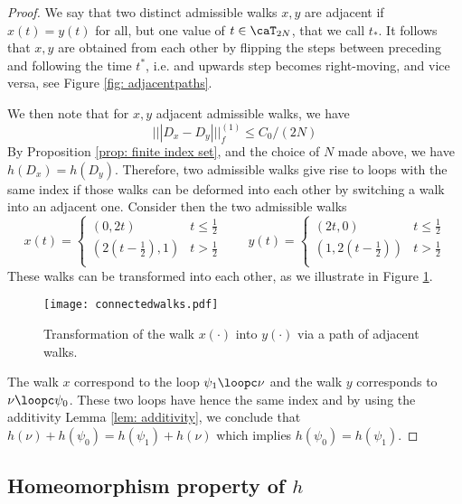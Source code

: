 \begin{proof}
	We say that two distinct admissible walks $x,y$ are adjacent if $x(t)=y(t)$ for all, but one value of $t\in\caT_{2N}$, that we call $t_*$.  It follows that $x,y$ are obtained from each other by flipping the steps between preceding and following the time $t^*$, i.e. and upwards step becomes right-moving, and vice versa, see Figure \ref{fig: adjacentpaths}.  
	
	We then note that for $x,y$ adjacent admissible walks, we have
	$$
	||| D_x-D_y |||^{(1)}_f \leq C_0/(2N)
	$$
	By Proposition \ref{prop: finite index set}, and the choice of $N$ made above, we have $h(D_x)=h(D_y)$.  Therefore, two admissible walks give rise to loops with the same index if those walks can be deformed into each other by switching a walk into an adjacent one. 
	Consider then the two admissible walks
	$$
	x(t)=\begin{cases} (0,2t) &  t \leq \tfrac{1}{2} \\
	(2(t- \tfrac{1}{2}),1) &  t  > \tfrac{1}{2} \\
	\end{cases}
	\qquad
	y(t)=\begin{cases} (2t,0) &  t \leq \tfrac{1}{2} \\
	(1, 2(t- \tfrac{1}{2}) ) &    t  > \tfrac{1}{2}  \\
	\end{cases}
	$$
	These walks can be transformed into each other, as we illustrate in Figure \ref{fig: connected walks}.
	\begin{figure}[htb!]
		\begin{center}
			\texttt{[image: connectedwalks.pdf]}
			\caption{Transformation of the walk $x(\cdot)$ into $y(\cdot)$ via a path of adjacent walks. 
			}
			\label{fig: connected walks}
		\end{center}
	\end{figure} 
	The walk $x$ correspond to the loop $\psi_1\loopc\nu$ and the walk $y$ corresponds to $\nu\loopc\psi_0$. These two loops have hence the same index and by using the additivity Lemma \ref{lem: additivity}, we conclude that $h(\nu)+h(\psi_0)= h(\psi_1)+h(\nu)$ which implies  $h(\psi_0)= h(\psi_1)$. 
\end{proof}


\subsection{Homeomorphism property of \texorpdfstring{$h$}{h}}\label{sec: group homomorfism}

